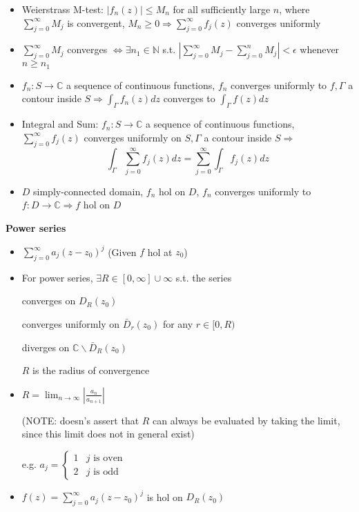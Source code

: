 \documentclass[10pt,a4paper]{article}
\begin{document}
\begin{multicols}{2}
\begin{itemize}
  \item Weierstrass M-test: $|f_n(z)|\leq M_n$ for all sufficiently large $n$, where $\sum_{j=0}^\infty M_j$ is convergent, $M_n \geq 0 \Rightarrow \sum_{j=0}^\infty f_j(z)$ converges uniformly
  
  \item $\sum_{j=0}^\infty M_j$ converges $\Leftrightarrow \exists n_1 \in \mathbb N$ s.t. $\left| \sum_{j=0}^\infty M_j - \sum_{j=0}^n M_j \right| < \epsilon$ whenever $n\geq n_1$
  
  \item $f_n: S\to \mathbb C$ a sequence of continuous functions, $f_n$ converges uniformly to $f, \Gamma$ a contour inside $S \Rightarrow \int_\Gamma f_n(z)dz$ converges to $\int_\Gamma f(z)dz$
  \item Integral and Sum: $f_n: S\to \mathbb C$ a sequence of continuous functions, $\sum_{j=0}^\infty f_j(z)$ converges uniformly on $S, \Gamma$ a contour inside $S \Rightarrow$ 
    $$\int_\Gamma \sum_{j=0}^\infty f_j(z)dz = \sum_{j=0}^\infty \int_\Gamma f_j(z)dz$$
  \item $D$ simply-connected domain, $f_n$ hol on $D$, $f_n$ converges uniformly to $f:D\to \mathbb C \Rightarrow f$ hol on $D$
\end{itemize}

\textbf{Power series}

\begin{itemize}
    \item $\sum_{j=0}^\infty a_j(z-z_0)^j$ (Given $f$ hol at $z_0$)
    \item For power series, $\exists R \in [0,\infty] \cup \infty$ s.t. the series
      
      converges on $D_R(z_0)$
    
      converges uniformly on $\bar D_r(z_0)$ for any $r\in[0,R)$
    
      diverges on $\mathbb C \backslash \bar D_R(z_0)$
      
      $R$ is the radius of convergence
    
    \item $R=\lim_{n\to \infty} \left| \frac{a_n}{a_{n+1}} \right|$ 
      
      (NOTE: doesn's assert that $R$ can always be evaluated by taking the limit, since this limit does not in general exist)
    
      e.g. $a_j=\begin{cases} 1 & j \text{ is oven} \\ 2 & j \text{ is odd} \end{cases}$
    \item $f(z)=\sum_{j=0}^\infty a_j(z-z_0)^j$ is hol on $D_R(z_0)$
\end{itemize}


\end{multicols}
\end{document}
